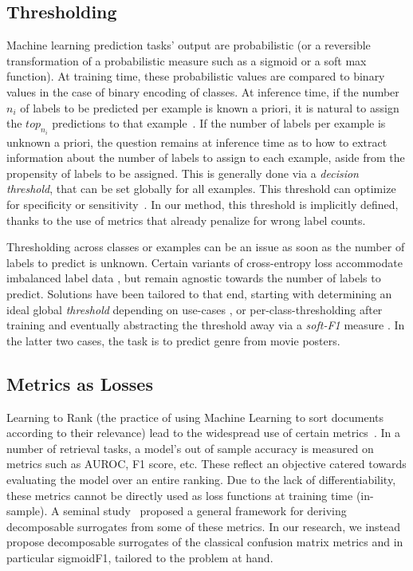 \subsection{Thresholding}
\label{subsec:thresh}

Machine learning prediction tasks' output are probabilistic (or a reversible
transformation of a probabilistic measure such as a sigmoid or a soft max
function). At training time, these probabilistic values are compared to binary
values in the case of binary encoding of classes. At inference time, if the
number $n_i$ of labels to be predicted per example is known a priori, it is
natural to assign the $top_{n_i}$ predictions to that
example~\cite{lossTopKError, topKmulticlassSVM}. If the number of labels per
example is unknown a priori, the question remains at inference time as to how
to extract information about the number of labels to assign to each example,
aside from the propensity of labels to be assigned. This is generally done via
a \emph{decision threshold}, that can be set globally for all examples. This
threshold can optimize for specificity or
sensitivity~\cite{decisionThreshold}. In our method, this threshold is
implicitly defined, thanks to the use of metrics that already penalize for
wrong label counts.

Thresholding across classes or examples can be an issue as soon as the number
of labels to predict is unknown. Certain variants of cross-entropy loss
accommodate imbalanced label data  \cite{focalLoss}, but remain agnostic
towards the number of labels to predict. Solutions have been tailored to that
end, starting with determining an ideal global \emph{threshold} depending on
use-cases \cite{threshForF1}, or per-class-thresholding after training
\cite{moviePosters} and eventually abstracting the threshold away via a
\emph{soft-F1} measure \cite{softF1}. In the latter two cases, the task is to
predict genre from movie posters.

\subsection{Metrics as Losses}

Learning to Rank (the practice of using Machine Learning to sort documents
according to their relevance) lead to the widespread use of certain
metrics~\cite{LTR}. In a number of retrieval tasks, a model's out of sample
accuracy is measured on metrics such as AUROC, F1 score, etc. These reflect an
objective catered towards evaluating the model over an entire ranking. Due to
the lack of differentiability, these metrics cannot be directly used as loss
functions at training time (in-sample). A seminal
study~\cite{optimizableLosses} proposed a general framework for deriving
decomposable surrogates from some of these metrics. In our research, we
instead propose decomposable surrogates of the classical confusion matrix
metrics and in particular sigmoidF1, tailored to the problem at hand.

